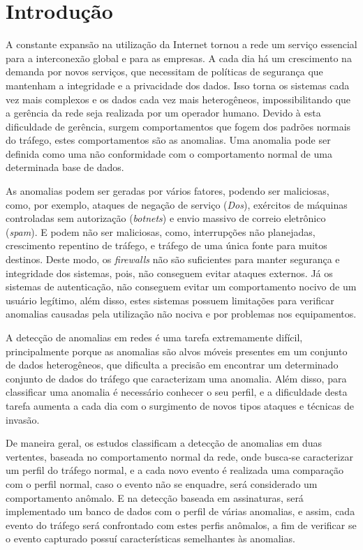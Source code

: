 \chapter{Introdução}%
\indent A constante expansão na utilização da Internet tornou a rede um serviço essencial para a interconexão global e para as empresas. A cada dia há um crescimento na demanda por  novos serviços, que necessitam de políticas de segurança que mantenham a integridade e a privacidade dos dados. Isso torna os sistemas cada vez mais complexos e os dados cada vez mais heterogêneos, impossibilitando que a gerência da rede seja realizada por um operador humano. Devido à esta dificuldade de gerência, surgem comportamentos que fogem dos padrões normais do tráfego, estes comportamentos são as anomalias. Uma anomalia pode ser definida como uma não conformidade com o comportamento normal de uma determinada base de dados.

\indent As anomalias podem ser geradas por vários fatores, podendo ser maliciosas, como, por exemplo, ataques de negação de serviço (\textit{Dos}), exércitos de máquinas controladas sem autorização (\textit{botnets}) e envio massivo de correio eletrônico (\textit{spam}). E podem não ser maliciosas, como, interrupções não planejadas, crescimento repentino de tráfego, e tráfego de uma única fonte para muitos destinos. Deste modo, os \textit{firewalls} não são suficientes para manter segurança e integridade dos sistemas, pois, não conseguem evitar ataques externos. Já os sistemas de autenticação, não conseguem evitar um comportamento nocivo de um usuário legítimo, além disso, estes sistemas possuem limitações para verificar anomalias causadas pela utilização não nociva e por problemas nos equipamentos.

\indent A detecção de anomalias em redes é uma tarefa extremamente difícil, principalmente porque as anomalias são alvos móveis presentes em um conjunto de dados heterogêneos, que dificulta a precisão em encontrar um determinado conjunto de dados do tráfego que caracterizam uma anomalia. Além disso, para classificar uma anomalia é necessário conhecer o seu perfil, e a dificuldade desta tarefa aumenta a cada dia com o surgimento de novos tipos ataques e técnicas de invasão.

\indent De maneira geral, os estudos classificam a detecção de anomalias em duas vertentes, baseada no comportamento normal da rede, onde busca-se caracterizar um perfil do tráfego normal, e a cada novo evento é realizada uma comparação com o perfil normal, caso o evento não se enquadre, será considerado um comportamento anômalo. E na detecção baseada em assinaturas, será implementado um banco de dados com o perfil de várias anomalias, e assim, cada evento do tráfego será confrontado com estes perfis anômalos, a fim de verificar se o evento capturado possuí características semelhantes às anomalias.

